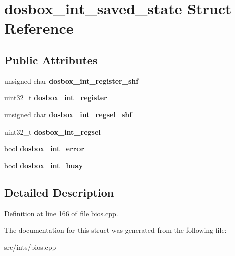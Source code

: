 \hypertarget{structdosbox__int__saved__state}{\section{dosbox\-\_\-int\-\_\-saved\-\_\-state Struct Reference}
\label{structdosbox__int__saved__state}
}
\subsection*{Public Attributes}
\begin{DoxyCompactItemize}
\item 
\hypertarget{structdosbox__int__saved__state_a3190dad41dc7ebdb7a5e478c37fba33e}{unsigned char {\bfseries dosbox\-\_\-int\-\_\-register\-\_\-shf}}\label{structdosbox__int__saved__state_a3190dad41dc7ebdb7a5e478c37fba33e}

\item 
\hypertarget{structdosbox__int__saved__state_a4cf4d84310e8ea530f67d12b6dd47aca}{uint32\-\_\-t {\bfseries dosbox\-\_\-int\-\_\-register}}\label{structdosbox__int__saved__state_a4cf4d84310e8ea530f67d12b6dd47aca}

\item 
\hypertarget{structdosbox__int__saved__state_a8baf767617af9ec07f8179944c14d327}{unsigned char {\bfseries dosbox\-\_\-int\-\_\-regsel\-\_\-shf}}\label{structdosbox__int__saved__state_a8baf767617af9ec07f8179944c14d327}

\item 
\hypertarget{structdosbox__int__saved__state_a22e6fa7e3be634cbbc53513c894a9612}{uint32\-\_\-t {\bfseries dosbox\-\_\-int\-\_\-regsel}}\label{structdosbox__int__saved__state_a22e6fa7e3be634cbbc53513c894a9612}

\item 
\hypertarget{structdosbox__int__saved__state_ad5b90f6e340dc6be7d0f6c1cd9c24056}{bool {\bfseries dosbox\-\_\-int\-\_\-error}}\label{structdosbox__int__saved__state_ad5b90f6e340dc6be7d0f6c1cd9c24056}

\item 
\hypertarget{structdosbox__int__saved__state_a61744b295bdc81881e4d05f2bd22f194}{bool {\bfseries dosbox\-\_\-int\-\_\-busy}}\label{structdosbox__int__saved__state_a61744b295bdc81881e4d05f2bd22f194}

\end{DoxyCompactItemize}


\subsection{Detailed Description}


Definition at line 166 of file bios.\-cpp.



The documentation for this struct was generated from the following file\-:\begin{DoxyCompactItemize}
\item 
src/ints/bios.\-cpp\end{DoxyCompactItemize}
